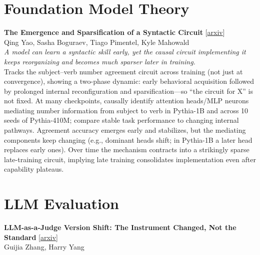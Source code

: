 \documentclass[12pt,letterpaper]{article}
\begin{document}
\medskip


\section*{Foundation Model Theory}

{\small\textbf{The Emergence and Sparsification of a Syntactic Circuit}} {\scriptsize[\href{https://arxiv.org/abs/2610.33299}{arxiv}]}\\
{\scriptsize Qing Yao, Sasha Boguraev, Tiago Pimentel, Kyle Mahowald}\\

{\small\textit{A model can learn a syntactic skill early, yet the causal circuit implementing it keeps reorganizing and becomes much sparser later in training.}}\\[1pt]
{\footnotesize Tracks the subject--verb number agreement circuit across training (not just at convergence), showing a two-phase dynamic: early behavioral acquisition followed by prolonged internal reconfiguration and sparsification---so ``the circuit for X'' is not fixed. At many checkpoints, causally identify attention heads/MLP neurons mediating number information from subject to verb in Pythia-1B and across 10 seeds of Pythia-410M; compare stable task performance to changing internal pathways. Agreement accuracy emerges early and stabilizes, but the mediating components keep changing (e.g., dominant heads shift; in Pythia-1B a later head replaces early ones). Over time the mechanism contracts into a strikingly sparse late-training circuit, implying late training consolidates implementation even after capability plateaus.}

\medskip


\section*{LLM Evaluation}

{\small\textbf{LLM-as-a-Judge Version Shift: The Instrument Changed, Not the Standard}} {\scriptsize[\href{https://arxiv.org/abs/2610.32986}{arxiv}]}\\
{\scriptsize Guijia Zhang, Harry Yang}\\
\end{document}
